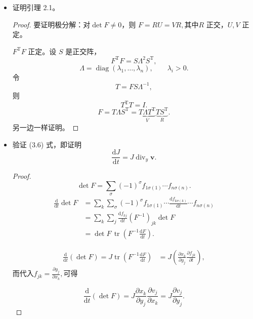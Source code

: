 \begin{itemize}
    \item[1.]证明引理 2.1。

    \begin{proof}
    要证明极分解：对$\det F\neq0$，则
    \(F=RU=VR,\)其中$R$ 正交，$U,V$ 正定。

    $F^{\mathrm T}F$ 正定。设 $S$ 是正交阵，
    $$
    F^{\mathrm T}F=S\Lambda^2S^{\mathrm T},
    $$
    $$
    \Lambda=\operatorname{diag}(\lambda_1,\ldots,\lambda_n),
    \qquad \lambda_i>0.
    $$
    令
    $$
    T=FS\Lambda^{-1},
    $$
    则
    $$
    T^{\mathrm T}T=I.
    $$
    $$
    F=T\Lambda S^{\mathrm T}
    =\underbrace{T\Lambda T^{\mathrm T}}_{V}
    \underbrace{TS^{\mathrm T}}_{R}.
    $$
    另一边一样证明。
    \end{proof}

    \item[2.]验证 (3.6) 式，即证明
    $$
    \frac{\mathrm dJ}{\mathrm dt}
    =J\operatorname{div}_y\boldsymbol{v}.
    $$

    \begin{proof}
    
    $$
    \det F=\sum_\sigma(-1)^\sigma
    f_{1\sigma(1)}\cdots f_{n\sigma(n)}.
    $$
    \begin{equation*}
        \begin{aligned}
            \frac{\mathrm d}{\mathrm dt}\det F
    &=\sum_k\sum_\sigma(-1)^\sigma
    f_{1\sigma(1)}\cdots
    \frac{\mathrm df_{k\sigma(k)}}{\mathrm dt}
    \cdots f_{n\sigma(n)}\\
    &=\sum_k\sum_j\frac{\mathrm df_{kj}}{\mathrm dt}
    (F^{-1})_{jk}\det F\\
    &=\det F\,
    \operatorname{tr}\left(F^{-1}\frac{\mathrm dF}{\mathrm dt}\right).
        \end{aligned}
    \end{equation*}


    $$
    \begin{aligned}
    \frac{\mathrm d}{\mathrm dt}(\det F)=J\operatorname{tr}\left(F^{-1}\frac{\mathrm dF}{\mathrm dt}\right)
    &=J\left(
    \frac{\partial x_k}{\partial y_j}
    \frac{\partial f_{jk}}{\partial t}
    \right),
    \end{aligned}
    $$
    而代入$f_{jk}=\frac{\partial y_j}{\partial x_k},$可得

    \[\frac{\mathrm d}{\mathrm dt}(\det F)
    =J\frac{\partial x_k}{\partial y_j}
    \frac{\partial v_j}{\partial x_k}
    =J\frac{\partial v_j}{\partial y_j}.\]
    

\end{proof}
\end{itemize}
